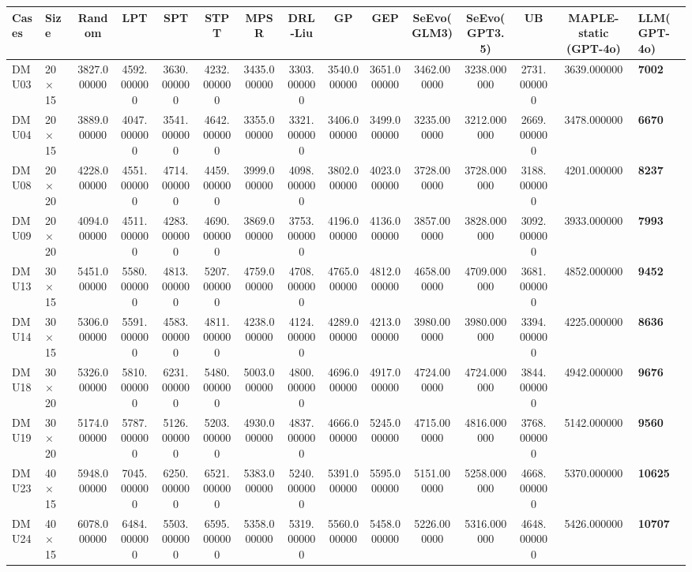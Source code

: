 \begin{tabular}{llcccccccccccc}
\toprule
Cases & Size & Random & LPT & SPT & STPT & MPSR & DRL-Liu & GP & GEP & SeEvo(GLM3) & SeEvo(GPT3.5) & UB & MAPLE-static (GPT-4o) & LLM(GPT-4o) \\
\midrule
DMU03 & 20 × 15 & 3827.000000 & 4592.000000 & 3630.000000 & 4232.000000 & 3435.000000 & 3303.000000 & 3540.000000 & 3651.000000 & 3462.000000 & 3238.000000 & 2731.000000 & 3639.000000 & \textbf{7002} \\
DMU04 & 20 × 15 & 3889.000000 & 4047.000000 & 3541.000000 & 4642.000000 & 3355.000000 & 3321.000000 & 3406.000000 & 3499.000000 & 3235.000000 & 3212.000000 & 2669.000000 & 3478.000000 & \textbf{6670} \\
DMU08 & 20 × 20 & 4228.000000 & 4551.000000 & 4714.000000 & 4459.000000 & 3999.000000 & 4098.000000 & 3802.000000 & 4023.000000 & 3728.000000 & 3728.000000 & 3188.000000 & 4201.000000 & \textbf{8237} \\
DMU09 & 20 × 20 & 4094.000000 & 4511.000000 & 4283.000000 & 4690.000000 & 3869.000000 & 3753.000000 & 4196.000000 & 4136.000000 & 3857.000000 & 3828.000000 & 3092.000000 & 3933.000000 & \textbf{7993} \\
DMU13 & 30 × 15 & 5451.000000 & 5580.000000 & 4813.000000 & 5207.000000 & 4759.000000 & 4708.000000 & 4765.000000 & 4812.000000 & 4658.000000 & 4709.000000 & 3681.000000 & 4852.000000 & \textbf{9452} \\
DMU14 & 30 × 15 & 5306.000000 & 5591.000000 & 4583.000000 & 4811.000000 & 4238.000000 & 4124.000000 & 4289.000000 & 4213.000000 & 3980.000000 & 3980.000000 & 3394.000000 & 4225.000000 & \textbf{8636} \\
DMU18 & 30 × 20 & 5326.000000 & 5810.000000 & 6231.000000 & 5480.000000 & 5003.000000 & 4800.000000 & 4696.000000 & 4917.000000 & 4724.000000 & 4724.000000 & 3844.000000 & 4942.000000 & \textbf{9676} \\
DMU19 & 30 × 20 & 5174.000000 & 5787.000000 & 5126.000000 & 5203.000000 & 4930.000000 & 4837.000000 & 4666.000000 & 5245.000000 & 4715.000000 & 4816.000000 & 3768.000000 & 5142.000000 & \textbf{9560} \\
DMU23 & 40 × 15 & 5948.000000 & 7045.000000 & 6250.000000 & 6521.000000 & 5383.000000 & 5240.000000 & 5391.000000 & 5595.000000 & 5151.000000 & 5258.000000 & 4668.000000 & 5370.000000 & \textbf{10625} \\
DMU24 & 40 × 15 & 6078.000000 & 6484.000000 & 5503.000000 & 6595.000000 & 5358.000000 & 5319.000000 & 5560.000000 & 5458.000000 & 5226.000000 & 5316.000000 & 4648.000000 & 5426.000000 & \textbf{10707} \\

\end{tabular}
